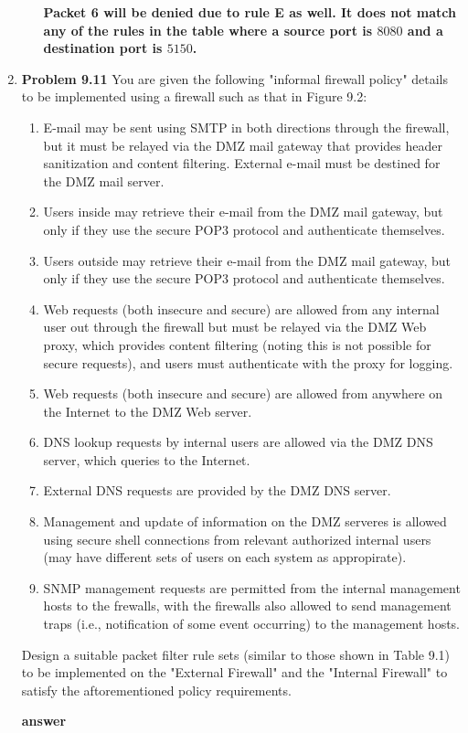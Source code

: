 \documentclass[12pt]{article}
\begin{document}
\begin{enumerate}
\begin{enumerate}
    \textbf{Packet 6 will be denied due to rule E as well. It does not match any of the rules in the table where a source port is $8080$ and a destination port is $5150$.} \\
  \end{enumerate}

  \item \textbf{Problem 9.11} You are given the following "informal firewall policy" details to be implemented using a firewall such as that in Figure 9.2: \\

  \begin{enumerate}
    \item E-mail may be sent using SMTP in both directions through the firewall, but it must be relayed via the DMZ mail gateway that provides header sanitization and content filtering. External e-mail must be destined for the DMZ mail server.
    \item Users inside may retrieve their e-mail from the DMZ mail gateway, but only if they use the secure POP3 protocol and authenticate themselves.
    \item Users outside may retrieve their e-mail from the DMZ mail gateway, but only if they use the secure POP3 protocol and authenticate themselves.
    \item Web requests (both insecure and secure) are allowed from any internal user out through the firewall but must be relayed via the DMZ Web proxy, which provides content filtering (noting this is not possible for secure requests), and users must authenticate with the proxy for logging.
    \item Web requests (both insecure and secure) are allowed from anywhere on the Internet to the DMZ Web server.
    \item DNS lookup requests by internal users are allowed via the DMZ DNS server, which queries to the Internet.
    \item External DNS requests are provided by the DMZ DNS server.
    \item Management and update of information on the DMZ serveres is allowed using secure shell connections from relevant authorized internal users (may have different sets of users on each system as appropirate).
    \item SNMP management requests are permitted from the internal management hosts to the frewalls, with the firewalls also allowed to send management traps (i.e., notification of some event occurring) to the management hosts.
  \end{enumerate}

  Design a suitable packet filter rule sets (similar to those shown in Table 9.1) to be implemented on the "External Firewall" and the "Internal Firewall" to satisfy the aftorementioned policy requirements.

  \textbf{answer} \\

\end{enumerate}
\end{document}
